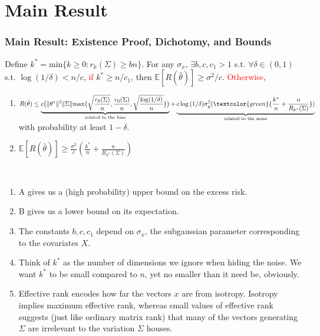 \documentclass[pdf]{beamer}
\begin{document}
\section{Main Result}

\begin{frame}
\fontsize{8pt}{9pt}
\frametitle{Main Result: Existence Proof, Dichotomy, and Bounds}

\begin{theorem}
Define $k^{*}= \text{min}\{ k\geq 0 : r_{k}(\Sigma) \geq bn \} $.  For any $\sigma_{x}$, $\exists b, c, c_{1} > 1$ s.t. $\forall\delta  \in (0,1)$ s.t. $\log({1/\delta}) < n/c$, \textcolor{red}{if} $k^{*} \geq n / c_{1}$, then $\mathbb{E}[R(\hat\theta)] \geq \sigma^{2}/c$.  \textcolor{red}{Otherwise},
        \begin{enumerate}[A]
        \item $R(\hat\theta) \leq \underbrace{c\big( \| \theta^{*} \|^{2}\| \Sigma \| \text{max}\{ \sqrt{\frac{r_{0}(\Sigma)}{n}}, \frac{r_{0}(\Sigma)}{n}, \sqrt{\frac{\log(1/\delta)}{n}} \}\big) }_\text{related to the bias}  + \underbrace{ c\log{ (1/\delta) }\sigma^{2}_{y}(  \textcolor{green}{\frac{k^{*}}{n} + \frac{n}{R_{k^{*}}(\Sigma)} } ) }_\text{related to the noise}$ with probability at least $1 - \delta$.
        \item $\mathbb{E}[R(\hat\theta)] \geq \frac{\sigma^{2}}{c}(  \frac{k^{*}}{n} + \frac{n}{R_{k^{*}}(\Sigma)} )$
        \end{enumerate}
\end{theorem}

\\
\begin{enumerate}
\item<3-7> A gives us a (high probability) upper bound on the excess risk.
\item<4-7> B gives us a lower bound on its expectation.
\item<5-7> The constants $b, c, c_{1}$ depend on $\sigma_{x}$, the subgaussian parameter corresponding to the covariates $X$.
\item<6-7> Think of $k^{*}$ as the number of dimensions we ignore when hiding the noise.  We want $k^{*}$ to be small compared to $n$, yet no smaller than it need be, obviously.
\item<7-7> Effective rank encodes how far the vectors $x$ are from isotropy.  Isotropy implies maximum effective rank, whereas small values of effective rank suggests (just like ordinary matrix rank) that many of the vectors generating $\Sigma$ are irrelevant to the variation $\Sigma$  houses.

\end{enumerate}
\end{frame}
\end{document}
